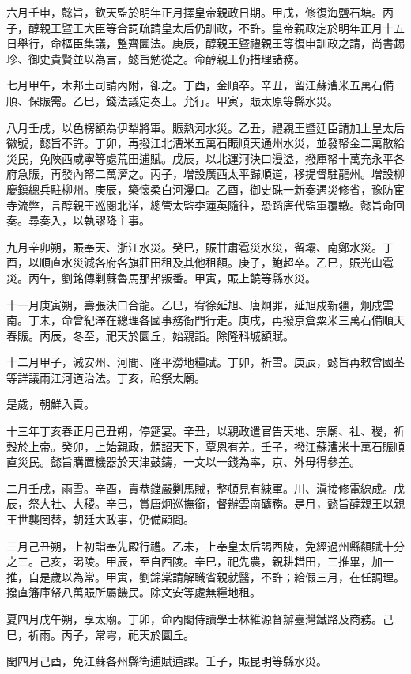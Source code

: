 \begin{pinyinscope}
六月壬申，懿旨，欽天監於明年正月擇皇帝親政日期。甲戌，修復海鹽石塘。丙子，醇親王暨王大臣等合詞疏請皇太后仍訓政，不許。皇帝親政定於明年正月十五日舉行，命樞臣集議，整齊圜法。庚辰，醇親王暨禮親王等復申訓政之請，尚書錫珍、御史貴賢並以為言，懿旨勉從之。命醇親王仍措理諸務。

七月甲午，木邦土司請內附，卻之。丁酉，金順卒。辛丑，留江蘇漕米五萬石備順、保賑需。乙巳，錢法議定奏上。允行。甲寅，賑太原等縣水災。

八月壬戌，以色楞額為伊犁將軍。賑熱河水災。乙丑，禮親王暨廷臣請加上皇太后徽號，懿旨不許。丁卯，再撥江北漕米五萬石賑順天通州水災，並發帑金二萬散給災民，免陜西咸寧等處荒田逋賦。戊辰，以北運河決口漫溢，撥庫帑十萬充永平各府急賑，再發內帑二萬濟之。丙子，增設廣西太平歸順道，移提督駐龍州。增設柳慶鎮總兵駐柳州。庚辰，築懷柔白河漫口。乙酉，御史硃一新奏遇災修省，豫防宦寺流弊，言醇親王巡閱北洋，總管太監李蓮英隨往，恐蹈唐代監軍覆轍。懿旨命回奏。尋奏入，以執謬降主事。

九月辛卯朔，賑奉天、浙江水災。癸巳，賑甘肅雹災水災，留壩、南鄭水災。丁酉，以順直水災減各府各旗莊田租及其他租額。庚子，鮑超卒。乙巳，賑光山雹災。丙午，劉銘傳剿蘇魯馬那邦叛番。甲寅，賑上饒等縣水災。

十一月庚寅朔，壽張決口合龍。乙巳，宥徐延旭、唐炯罪，延旭戍新疆，炯戍雲南。丁未，命曾紀澤在總理各國事務衙門行走。庚戌，再撥京倉粟米三萬石備順天春賑。丙辰，冬至，祀天於圜丘，始親詣。除隆科城額賦。

十二月甲子，減安州、河間、隆平澇地糧賦。丁卯，祈雪。庚辰，懿旨再敕曾國荃等詳議兩江河道治法。丁亥，祫祭太廟。

是歲，朝鮮入貢。

十三年丁亥春正月己丑朔，停筵宴。辛丑，以親政遣官告天地、宗廟、社、稷，祈穀於上帝。癸卯，上始親政，頒詔天下，覃恩有差。壬子，撥江蘇漕米十萬石賑順直災民。懿旨購置機器於天津鼓鑄，一文以一錢為率，京、外毋得參差。

二月壬戌，雨雪。辛酉，責恭鏜嚴剿馬賊，整頓見有練軍。川、滇接修電線成。戊辰，祭大社、大稷。辛巳，賞唐炯巡撫銜，督辦雲南礦務。是月，懿旨醇親王以親王世襲罔替，朝廷大政事，仍備顧問。

三月己丑朔，上初詣奉先殿行禮。乙未，上奉皇太后謁西陵，免經過州縣額賦十分之三。己亥，謁陵。甲辰，至自西陵。辛巳，祀先農，親耕耤田，三推畢，加一推，自是歲以為常。甲寅，劉錦棠請解職省親就醫，不許；給假三月，在任調理。撥直籓庫帑八萬賑所屬饑民。除文安等處無糧地租。

夏四月戊午朔，享太廟。丁卯，命內閣侍讀學士林維源督辦臺灣鐵路及商務。己巳，祈雨。丙子，常雩，祀天於圜丘。

閏四月己酉，免江蘇各州縣衛逋賦逋課。壬子，賑昆明等縣水災。


\end{pinyinscope}
